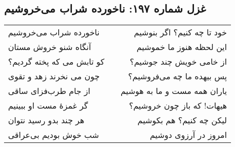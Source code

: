 \begin{center}
\section*{غزل شماره ۱۹۷: ناخورده شراب می‌خروشیم}
\label{sec:197}
\begin{longtable}{l p{0.5cm} r}
ناخورده شراب می‌خروشیم
&&
خود تا چه کنیم؟ اگر بنوشیم
\\
آنگاه شنو خروش مستان
&&
این لحظه هنوز ما خموشیم
\\
کو تابش می که پخته گردیم؟
&&
از خامی خویش چند جوشیم؟
\\
چون می نخرند زهد و تقوی
&&
پس بیهده ما چه می‌فروشیم؟
\\
از جام طرب‌فزای ساقی
&&
یاران همه مست و ما به هوشیم
\\
گر غمزهٔ مست او ببینیم
&&
هیهات! که باز چون خروشیم؟
\\
هر چند بدو رسید نتوان
&&
لیکن چه کنیم؟ هم بکوشیم
\\
شب خوش بودیم بی‌عراقی
&&
امروز در آرزوی دوشیم
\\
\end{longtable}
\end{center}
